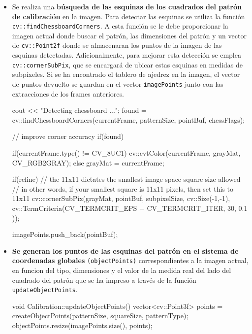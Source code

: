 \begin{itemize}

\item Se realiza una \textbf{búsqueda de las esquinas de los cuadrados del patrón de calibración} en la imagen. Para detectar las esquinas se utiliza la función \texttt{cv::findChessboardCorners}. A esta función se le debe proporcionar la imagen actual donde buscar el patrón, las dimensiones del patrón y un vector de \texttt{cv::Point2f} donde se almacenaran los puntos de la imagen de las esquinas detectadas. Adicionalmente, para mejorar esta detección se emplea \texttt{cv::cornerSubPix}, que se encargará de ubicar estas esquinas en medidas de subpíxeles. Si se ha encontrado el tablero de ajedrez en la imagen, el vector de puntos devuelto se guardan en el vector \texttt{imagePoints} junto con las extracciones de los frames anteriores.  

\begin{listing}[
  float=ht,
  language = C++,
  caption  = {Detección de las esquinas del patrón \emph{Chessboard}},
  label    = code:findChessBoard]
  cout << "Detecting chessboard ...";
  found = cv::findChessboardCorners(currentFrame, patternSize, pointBuf, chessFlags);

  // improve corner accuracy
  if(found) {
    if(currentFrame.type() != CV_8UC1) 
    cv::cvtColor(currentFrame, grayMat, CV_RGB2GRAY);
    else 
    grayMat = currentFrame;
    
    if(refine)
    // the 11x11 dictates the smallest image space square size allowed
    // in other words, if your smallest square is 11x11 pixels, then set this to 11x11
    cv::cornerSubPix(grayMat, pointBuf, subpixelSize,  cv::Size(-1,-1), cv::TermCriteria(CV_TERMCRIT_EPS + CV_TERMCRIT_ITER, 30, 0.1 ));
  }
  
  imagePoints.push_back(pointBuf);
\end{listing}

\item \textbf{Se generan los puntos de las esquinas del patrón en el sistema de coordenadas globales} \texttt{(objectPoints)} correspondientes a la imagen actual, en funcion del tipo, dimensiones y el valor de la medida real del lado del cuadrado del patrón que se ha impreso a través de la función \texttt{updateObjectPoints}.
\begin{listing}[
  float=ht,
  language = C++,
  caption  = {Función \texttt{Calibration::updateObjectPoints()}},
  label    = code:updateObjectPoints]
  void Calibration::updateObjectPoints() {
    vector<cv::Point3f> points = createObjectPoints(patternSize, squareSize, patternType);
    objectPoints.resize(imagePoints.size(), points);
  }
\end{listing}


\end{itemize}
